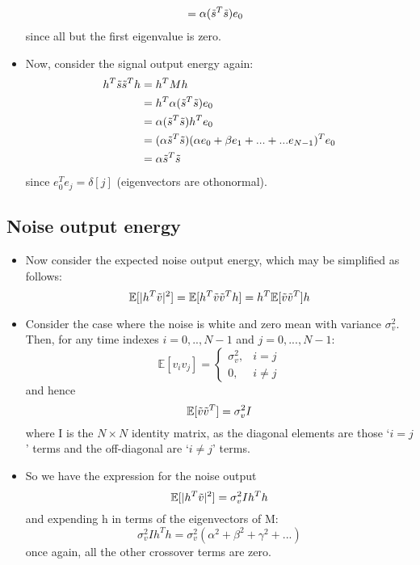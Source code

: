 \documentclass[12pt]{article}
\newcommand{\sigd}{\sigma^2}
\newcommand{\mexp}{\mathbb{E}}
\begin{document}
\begin{itemize}
\begin{align*}
        & = \alpha(\Tilde{s}^T \Tilde{s})e_0
    \end{align*}
    since all but the first eigenvalue is zero.
    \item Now, consider the signal output energy again:
    \begin{align*}
        h^T\Tilde{s}\Tilde{s}^T h & = h^T M h \\
        & = h^T \alpha (\Tilde{s}^T \Tilde{s})e_0 \\
        & = \alpha (\Tilde{s}^T \Tilde{s}) h^T e_0 \\
        & = (\alpha \Tilde{s}^T \Tilde{s}) (\alpha e_0 + \beta e_1 +... +...e_{N-1})^T e_0\\
        & = \alpha \Tilde{s}^T \Tilde{s}
    \end{align*}
    since $e_0^T e_j = \delta[j]$ (eigenvectors are othonormal).
\end{itemize}

\subsection{Noise output energy}
\begin{itemize}
    \item Now consider the expected noise output energy, which may be simplified as follows:
    \[
    \mexp[|h^T\Tilde{v}|^2] = \mexp[h^T\Tilde{v}\Tilde{v}^T h] = h^T \mexp[\Tilde{v}\Tilde{v}^T]h
    \]
    \item Consider the case where the noise is white and zero mean with variance $\sigd_v$. Then, for any time indexes $i=0,..,N-1$ and $j=0,...,N-1$:
    \[
    \mexp[v_iv_j] = \left\{\begin{array}{ll}
        \sigd_v, & i=j  \\
         0,& i\not = j 
    \end{array} \right.
    \]
    and hence 
    \[
    \mexp[\Tilde{v}\Tilde{v}^T] = \sigd_v I
    \]
    where I is the $N \times N$ identity matrix, as the diagonal elements are those `$i=j$' terms and the off-diagonal are `$i\not = j$' terms.
    \item So we have the expression for the noise output 
    \[
    \mexp[|h^T\Tilde{v}|^2] = \sigd_v I h^T h
    \]
    and expending h in terms of the eigenvectors of M:
    \[
    \sigd_v I h^T h = \sigd_v(\alpha^2 + \beta^2 + \gamma^2 + ...)
    \]
    once again, all the other crossover terms are zero.
\end{itemize}
\end{document}
